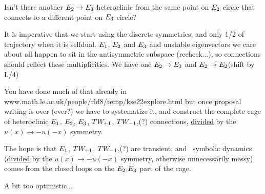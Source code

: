 
Isn't there another $ E_{2} \to E_{3} $ heteroclinic
from the same point on  $E_{2} $ circle that connects to a different point on
$E_{3}$ circle?

It is imperative that we start using the discrete symmetries, and only 1/2
of trajectory when it is selfdual. $E_{1}$, $E_{2}$ and $E_{3}$ and unstable eigenvectors
we care about all happen to sit in the antisymmetric subspace
(recheck...), so connections should reflect these multiplicities. We have
one $E_{2} \to E_{3}$ and $E_{2} \to E_{2}$(shift by L/4)

You have done much of that already in
        www.math.le.ac.uk/people/rld8/temp/kse22explore.html
but once proposal writing is over (ever?) we have to systematize it, and
construct the complete cage of heteroclinic $E_{1}$, $E_{2}$, $E_{3}$,
$TW_{+1}$,
$TW_{-1}$,(?)
connections, \underline{divided} by the $u(x) \to - u(-x)$ symmetry.

The hope is that $E_{1}$, 
$TW_{+1}$,
$TW_{-1}$,(?) are transient, and \rpo\ symbolic
dynamics (\underline{divided} by the $u(x) \to - u(-x)$ symmetry, otherwise
unnecessarily messy) comes from the closed loops on 
the $E_{2}$,$E_{3}$ part of the cage.

A bit too optimistic...




